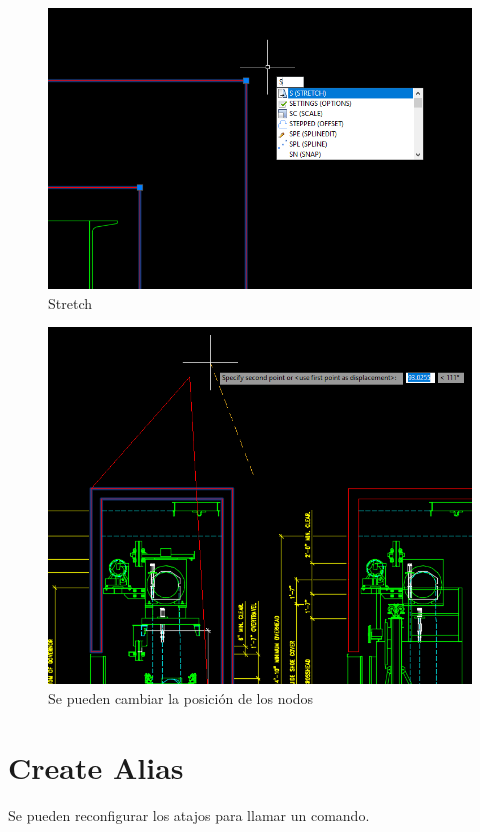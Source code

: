 \documentclass{report}
\begin{document}
\begin{figure}[H]
	\centering
	\includegraphics[width=0.85\linewidth, height=0.5\textheight,keepaspectratio]{Imagenes/autocad_stretch02}
	\caption{Stretch}
	\label{fig:autocadstretch02}
\end{figure}

\begin{figure}[H]
	\centering
	\includegraphics[width=0.85\linewidth, height=0.5\textheight,keepaspectratio]{Imagenes/autocad_stretch03}
	\caption{Se pueden cambiar la posición de los nodos}
	\label{fig:autocadstretch03}
\end{figure}


\chapter{Create Alias}

Se pueden reconfigurar los atajos para llamar un comando.
\end{document}

